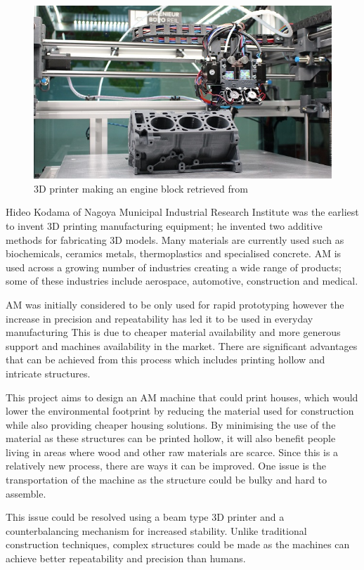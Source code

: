 \documentclass{UoNMCHA}
\numberwithin{equation}{section}
\begin{document}
		\begin{figure}[H]
		\begin{center}
			\includegraphics[width=.75\linewidth]{figs/ali Express}
			\caption{3D printer making an engine block retrieved from \cite{a2019_3d}}
			\label{figs/ali Express}
		\end{center}
	\end{figure}

	Hideo Kodama of Nagoya Municipal Industrial Research Institute was the earliest to invent 3D printing manufacturing equipment; he invented two additive methods for fabricating 3D models. Many materials are currently used such as biochemicals, ceramics metals, thermoplastics and specialised concrete. AM is used across a growing number of industries creating a wide range of products; some of these industries include aerospace, automotive, construction and medical. \par
	AM was initially considered to be only used for rapid prototyping however the increase in precision and repeatability has led it to be used in everyday manufacturing This is due to cheaper material availability and more generous support and machines availability in the market. There are significant advantages that can be achieved from this process which includes printing hollow and intricate structures. \par
	This project aims to design an AM machine that could print houses, which would lower the environmental footprint by reducing the material used for construction while also providing cheaper housing solutions.  By minimising the use of the material as these structures can be printed hollow, it will also benefit people living in areas where wood and other raw materials are scarce. Since this is a relatively new process, there are ways it can be improved. One issue is the transportation of the machine as the structure could be bulky and hard to assemble.  \par
	This issue could be resolved using a beam type 3D printer and a counterbalancing mechanism for increased stability. Unlike traditional construction techniques, complex structures could be made as the machines can achieve better repeatability and precision than humans. \par
	
\end{document}
